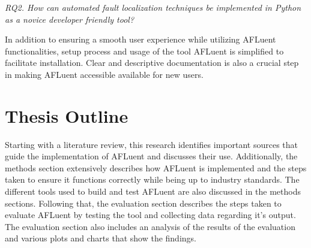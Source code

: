 \begin{center}
	\emph{RQ2. How can automated fault localization techniques be implemented in
	Python as a novice developer friendly tool?
	}
\end{center}
\label{para:RQ2}


In addition to ensuring a smooth user experience while utilizing AFLuent
functionalities, setup process and usage of the tool AFLuent is simplified to
facilitate installation. Clear and descriptive documentation is also a crucial
step in making AFLuent accessible available for new users.

\section{Thesis Outline}
\label{sec:outline}

Starting with a literature review, this research identifies important sources
that guide the implementation of AFLuent and discusses their use. Additionally,
the methods section extensively describes how AFLuent is implemented and the
steps taken to ensure it functions correctly while being up to industry
standards. The different tools used to build and test AFLuent are also
discussed in the methods sections. Following that, the evaluation section
describes the steps taken to evaluate AFLuent by testing the tool and
collecting data regarding it's output. The evaluation section also includes an
analysis of the results of the evaluation and various plots and charts that
show the findings.
